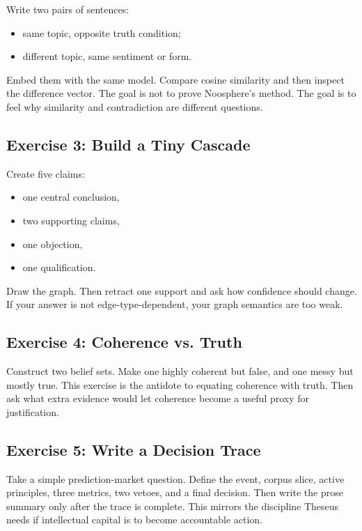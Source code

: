 \documentclass[11pt]{article}
\begin{document}
Write two pairs of sentences:

\begin{itemize}
\item same topic, opposite truth condition;
\item different topic, same sentiment or form.
\end{itemize}

Embed them with the same model. Compare cosine similarity and then inspect the
difference vector. The goal is not to prove Noosphere's method. The goal is to
feel why similarity and contradiction are different questions.

\subsection{Exercise 3: Build a Tiny Cascade}

Create five claims:

\begin{itemize}
\item one central conclusion,
\item two supporting claims,
\item one objection,
\item one qualification.
\end{itemize}

Draw the graph. Then retract one support and ask how confidence should change.
If your answer is not edge-type-dependent, your graph semantics are too weak.

\subsection{Exercise 4: Coherence vs. Truth}

Construct two belief sets. Make one highly coherent but false, and one messy
but mostly true. This exercise is the antidote to equating coherence with truth.
Then ask what extra evidence would let coherence become a useful proxy for
justification.

\subsection{Exercise 5: Write a Decision Trace}

Take a simple prediction-market question. Define the event, corpus slice, active
principles, three metrics, two vetoes, and a final decision. Then write the
prose summary only after the trace is complete. This mirrors the discipline
Theseus needs if intellectual capital is to become accountable action.
\end{document}
